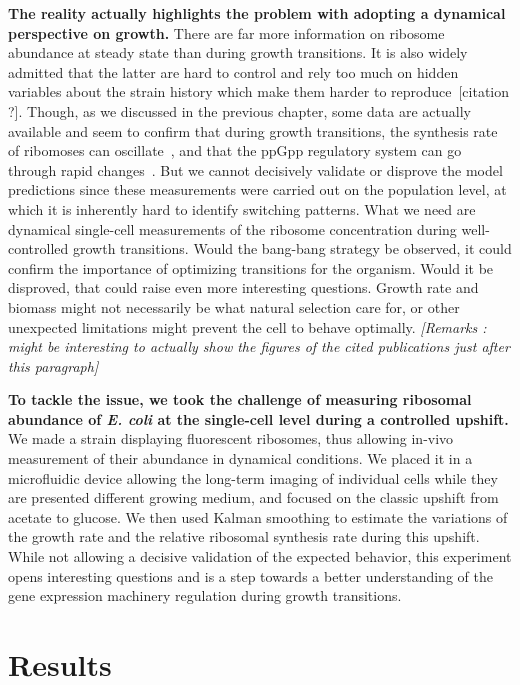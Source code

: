 \textbf{The reality actually highlights the problem with adopting a dynamical perspective on growth.}
There are far more information on ribosome abundance at steady state than during growth transitions.
It is also widely admitted that the latter are hard to control and rely too much on hidden variables about the strain history which make them harder to reproduce~[citation ?].
Though, as we discussed in the previous chapter, some data are actually available and seem to confirm that during growth transitions, the  synthesis rate of ribomoses can oscillate~\cite{gausing_regulation_1980,zengel_transcription_1986}, and that the ppGpp regulatory system can go through rapid changes~\cite{friesen_synthesis_1975,murray_control_2003}.
But we cannot decisively validate or disprove the model predictions since these measurements were carried out on the population level, at which it is inherently hard to identify switching patterns.
What we need are dynamical single-cell measurements of the ribosome concentration during well-controlled growth transitions.
Would the bang-bang strategy be observed, it could confirm the importance of optimizing transitions for the organism.
Would it be disproved, that could raise even more interesting questions.
Growth rate and biomass might not necessarily be what natural selection care for, or other unexpected limitations might prevent the cell to behave optimally.
\textit{[Remarks : might be interesting to actually show the figures of the cited publications just after this paragraph]}

\textbf{To tackle the issue, we took the challenge of measuring ribosomal abundance of \textit{E. coli} at the single-cell level during a controlled upshift.}
We made a strain displaying fluorescent ribosomes, thus allowing in-vivo measurement of their abundance in dynamical conditions.
We placed it in a microfluidic device allowing the long-term imaging of individual cells while they are presented different growing medium, and focused on the classic upshift from acetate to glucose.
We then used Kalman smoothing to estimate the variations of the growth rate and the relative ribosomal synthesis rate during this upshift.
While not allowing a decisive validation of the expected behavior, this experiment opens interesting questions and is a step towards a better understanding of the gene expression machinery regulation during growth transitions.

\section{Results}

